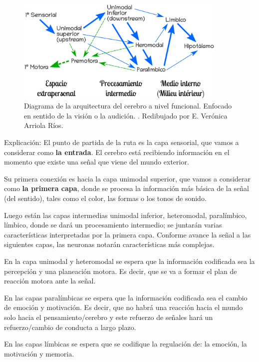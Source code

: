  \begin{figure}[h]
  \centering
  \includegraphics[width=0.9\textwidth]{../Figuras/zonasFuncionales.png}
  \caption{Diagrama de la arquitectura del cerebro a nivel funcional. Enfocado en sentido de la visión o la audición. \parencite{Mesulam1998}. Redibujado por E. Verónica Arriola Ríos. }
  \label{fig:zonasFun}
 \end{figure}

Explicación: El punto de partida de la ruta es la capa sensorial, que vamos a considerar como \textbf{la entrada}. El cerebro está recibiendo información en el momento que existe una señal que viene del mundo exterior.

Su primera conexión es hacia la capa unimodal superior, que vamos a considerar como \textbf{la primera capa}, donde se procesa la información más básica de la señal (del sentido), tales como el color, las formas o los tonos de sonido.

Luego están las capas intermedias unimodal inferior, heteromodal, paralímbico, límbico, donde se dará un procesamiento intermedio; se juntarán varias características interpretadas por la primera capa. Conforme avance la señal a las siguientes capas, las neuronas notarán características más complejas. 

En la capa unimodal y heteromodal se espera que la información codificada sea la percepción y una planeación motora. Es decir, que se va a formar el plan de reacción motora ante la señal. 

En las capas paralímbicas se espera que la información codificada sea el cambio de emoción y motivación. Es decir, que no habrá una reacción hacia el mundo solo hacia el pensamiento/cerebro y este refuerzo de señales hará un refuerzo/cambio de conducta a largo plazo.

En las capas límbicas se espera que se codifique la regulación de: la emoción, la motivación y memoria.

